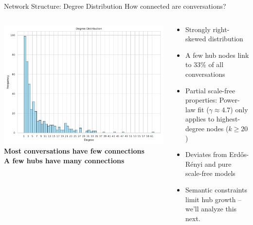 \documentclass[nodes]{beamer}
\begin{document}
\begin{frame}{Network Structure: Degree Distribution}
  How connected are conversations?
  \begin{columns}[T]
    \begin{column}{0.5\textwidth}
      \includegraphics[width=\linewidth]{images/degree_distribution_histogram.pdf}
      \scriptsize \textbf{Most conversations have few connections}\\
      \scriptsize \textbf{A few hubs have many connections}
    \end{column}
    \begin{column}{0.5\textwidth}
      \begin{itemize}
          \item Strongly right-skewed distribution
          \item A few hub nodes link to 33\% of all conversations
          \item \alert{Partial scale-free properties}: Power-law fit ($\gamma \approx 4.7$) only applies to highest-degree nodes ($k \ge 20$)
          \item Deviates from Erdős-Rényi and pure scale-free models
          \item Semantic constraints limit hub growth -- we'll analyze this next.
      \end{itemize}
    \end{column}
  \end{columns}
  \note{
    \begin{itemize}

\end{itemize}}
\end{frame}
\end{document}
